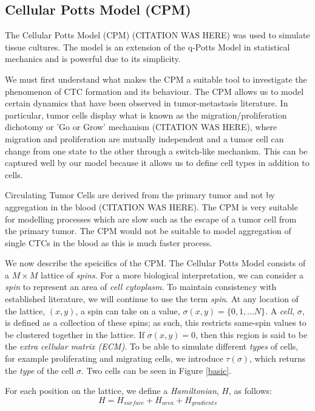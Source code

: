 \documentclass[12pt]{article}
\begin{document}
\subsection{Cellular Potts Model (CPM)}
The Cellular Potts Model (CPM) (CITATION WAS HERE) was used to simulate tissue cultures. The model is an extension of the q-Potts Model in statistical mechanics and is powerful due to its simplicity. 

We must first understand what makes the CPM a suitable tool to investigate the phenomenon of CTC formation and its behaviour. The CPM allows us to model certain dynamics that have been observed in tumor-metastasis literature. In particular, tumor cells display what is known as the migration/proliferation dichotomy or 'Go or Grow' mechanism (CITATION WAS HERE), where migration and proliferation are mutually independent and a tumor cell can change from one state to the other through a switch-like mechanism. This can be captured well by our model because it allows us to define cell types in addition to cells.

Circulating Tumor Cells are derived from the primary tumor and not by aggregation in the blood (CITATION WAS HERE). The CPM is very suitable for modelling processes which are slow such as the escape of a tumor cell from the primary tumor. The CPM would not be suitable to model aggregation of single CTCs in the blood as this is much faster process. 

We now describe the speicifics of the CPM. The Cellular Potts Model consists of a $M\times M$ lattice of \emph{spins}. For a more biological interpretation, we can consider a \emph{spin} to represent an area of \emph{cell cytoplasm}. To maintain consistency with established literature, we will continue to use the term \emph{spin}. At any location of the lattice, $(x,y)$, a spin can take on a value, $\sigma(x,y) = \{0,1,\ldots N\}$. A \emph{cell}, $\sigma$, is defined as a collection of these spins; as such, this restricts same-spin values to be clustered together in the lattice. If $\sigma(x,y) = 0$, then this region is said to be the \emph{extra cellular matrix (ECM)}. To be able to simulate different \emph{types} of cells, for example proliferating and migrating cells, we introduce $\tau(\sigma)$, which returns the \emph{type} of the cell $\sigma$. Two cells can be seen in Figure \ref{basic}.

For each position on the lattice, we define a \emph{Hamiltonian}, $H$, as follows:
\begin{equation}
	H = H_{surface} + H_{area} + H_{gradients}
	\label{hamiltonian}
\end{equation}
\end{document}
